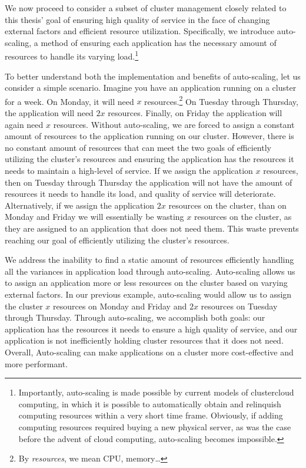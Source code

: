 We now proceed to consider a subset of cluster management closely related to
this thesis' goal of ensuring high quality of service in the face of changing
external factors and efficient resource utilization. Specifically, we introduce
auto-scaling, a method of ensuring each application has the necessary amount
of resources to handle its varying load.\footnote{Importantly, auto-scaling is
made possible by current models of cluster\/cloud computing, in which it is
possible to automatically obtain and relinquish computing resources within a
very short time frame. Obviously, if adding computing resources required buying
a new physical server, as was the case before the advent of cloud computing,
auto-scaling becomes impossible.}

To better understand both the implementation and benefits of auto-scaling, let
us consider a simple scenario. Imagine you have an application running on a
cluster for a week. On Monday, it will need $x$ resources.\footnote{By
  \textit{resources}, we mean CPU, memory\dots} On Tuesday through
Thursday, the application will need $2x$ resources. Finally, on Friday the
application will again need $x$ resources. Without auto-scaling, we are forced
to assign a constant amount of resources to the application running on our
cluster. However, there is no constant amount of resources that can meet
the two goals of efficiently utilizing the cluster's resources and ensuring the
application has the resources it needs to maintain a high-level of service. If
we assign the application $x$ resources, then on Tuesday through Thursday the
application will not have the amount of resources it needs to handle its load,
and quality of service will deteriorate. Alternatively, if we assign the
application $2x$ resources on the cluster, than on Monday and Friday we will
essentially be wasting $x$ resources on the cluster, as they are assigned to an
application that does not need them. This waste prevents reaching our goal of
efficiently utilizing the cluster's resources.

We address the inability to find a static amount of resources efficiently
handling all the variances in application load through auto-scaling.
Auto-scaling allows us to assign an application more or less resources on the
cluster based on varying external factors. In our previous example, auto-scaling
would allow us to assign the cluster $x$ resources on Monday and Friday and
$2x$ resources on Tuesday through Thursday. Through auto-scaling, we accomplish
both goals: our application has the resources it needs to ensure a high quality
of service, and our application is not inefficiently holding cluster resources
that it does not need. Overall, Auto-scaling can make applications on a cluster more
cost-effective and more performant.

